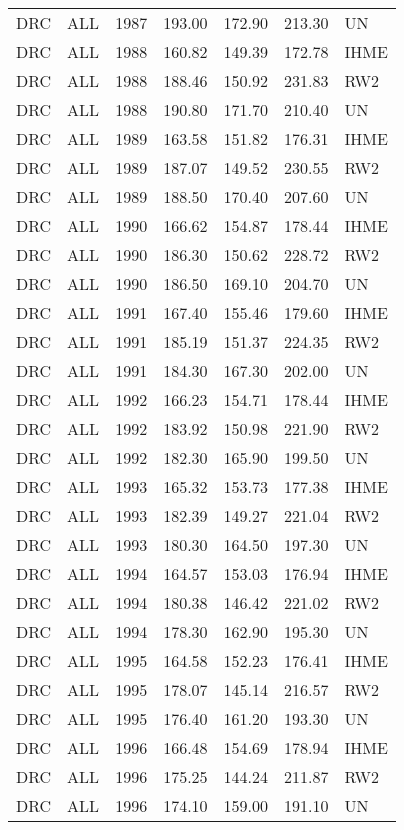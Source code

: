 \begin{longtable}{lllrrrl}
  DRC & ALL & 1987 & 193.00 & 172.90 & 213.30 & UN \\ 
  DRC & ALL & 1988 & 160.82 & 149.39 & 172.78 & IHME \\ 
  DRC & ALL & 1988 & 188.46 & 150.92 & 231.83 & RW2 \\ 
  DRC & ALL & 1988 & 190.80 & 171.70 & 210.40 & UN \\ 
  DRC & ALL & 1989 & 163.58 & 151.82 & 176.31 & IHME \\ 
  DRC & ALL & 1989 & 187.07 & 149.52 & 230.55 & RW2 \\ 
  DRC & ALL & 1989 & 188.50 & 170.40 & 207.60 & UN \\ 
  DRC & ALL & 1990 & 166.62 & 154.87 & 178.44 & IHME \\ 
  DRC & ALL & 1990 & 186.30 & 150.62 & 228.72 & RW2 \\ 
  DRC & ALL & 1990 & 186.50 & 169.10 & 204.70 & UN \\ 
  DRC & ALL & 1991 & 167.40 & 155.46 & 179.60 & IHME \\ 
  DRC & ALL & 1991 & 185.19 & 151.37 & 224.35 & RW2 \\ 
  DRC & ALL & 1991 & 184.30 & 167.30 & 202.00 & UN \\ 
  DRC & ALL & 1992 & 166.23 & 154.71 & 178.44 & IHME \\ 
  DRC & ALL & 1992 & 183.92 & 150.98 & 221.90 & RW2 \\ 
  DRC & ALL & 1992 & 182.30 & 165.90 & 199.50 & UN \\ 
  DRC & ALL & 1993 & 165.32 & 153.73 & 177.38 & IHME \\ 
  DRC & ALL & 1993 & 182.39 & 149.27 & 221.04 & RW2 \\ 
  DRC & ALL & 1993 & 180.30 & 164.50 & 197.30 & UN \\ 
  DRC & ALL & 1994 & 164.57 & 153.03 & 176.94 & IHME \\ 
  DRC & ALL & 1994 & 180.38 & 146.42 & 221.02 & RW2 \\ 
  DRC & ALL & 1994 & 178.30 & 162.90 & 195.30 & UN \\ 
  DRC & ALL & 1995 & 164.58 & 152.23 & 176.41 & IHME \\ 
  DRC & ALL & 1995 & 178.07 & 145.14 & 216.57 & RW2 \\ 
  DRC & ALL & 1995 & 176.40 & 161.20 & 193.30 & UN \\ 
  DRC & ALL & 1996 & 166.48 & 154.69 & 178.94 & IHME \\ 
  DRC & ALL & 1996 & 175.25 & 144.24 & 211.87 & RW2 \\ 
  DRC & ALL & 1996 & 174.10 & 159.00 & 191.10 & UN \\ 

\end{longtable}
